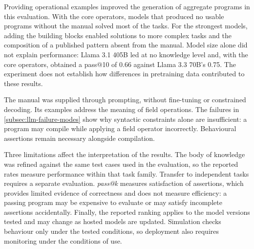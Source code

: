 Providing operational examples improved the generation of aggregate programs in this evaluation.
With the core operators, models that produced no usable programs without the manual solved most of the tasks.
For the strongest models, adding the building blocks enabled solutions to more complex tasks and the composition of a published pattern absent from the manual.
Model size alone did not explain performance:
Llama 3.1 405B led at no knowledge level and, with the core operators, obtained a pass@10 of 0.66 against Llama 3.3 70B's 0.75.
The experiment does not establish how differences in pretraining data contributed to these results.

The manual was supplied through prompting, without fine-tuning or constrained decoding.
Its examples address the meaning of field operations.
The failures in \cref{subsec:llm-failure-modes} show why syntactic constraints alone are insufficient:
a program may compile while applying a field operator incorrectly.
Behavioural assertions remain necessary alongside compilation.

Three limitations affect the interpretation of the results.
The body of knowledge was refined against the same test cases used in the evaluation,
so the reported rates measure performance within that task family.
Transfer to independent tasks requires a separate evaluation.
\emph{pass@k} measures satisfaction of assertions, which provides limited evidence of correctness and does not measure efficiency:
a passing program may be expensive to evaluate or may satisfy incomplete assertions accidentally.
Finally, the reported ranking applies to the model versions tested and may change as hosted models are updated.
Simulation checks behaviour only under the tested conditions, so deployment also requires monitoring under the conditions of use.
